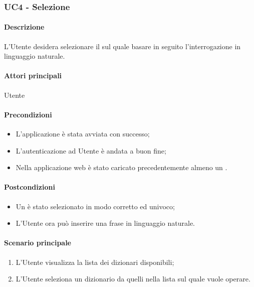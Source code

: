 \subsubsection{UC4 - Selezione }\label{UC4}
\paragraph*{Descrizione}
L’Utente desidera selezionare il  sul quale basare in seguito l’interrogazione in linguaggio naturale.

\paragraph*{Attori principali}
Utente

\paragraph*{Precondizioni}
\begin{itemize}
  \item L'applicazione è stata avviata con successo;
  \item L’autenticazione ad Utente è andata a buon fine;
  \item Nella applicazione web è stato caricato precedentemente almeno un .
\end{itemize}

\paragraph*{Postcondizioni}
\begin{itemize}
  \item Un  è stato selezionato in modo corretto ed univoco;
  \item L’Utente ora può inserire una frase in linguaggio naturale.
\end{itemize}

\paragraph*{Scenario principale}
\begin{enumerate}
  \item L’Utente visualizza la lista dei dizionari disponibili;
  \item L’Utente seleziona un dizionario da quelli nella lista sul quale vuole operare.
\end{enumerate}
